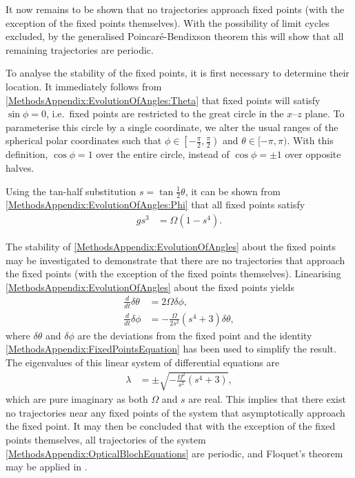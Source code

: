 It now remains to be shown that no trajectories approach fixed points (with the exception of the fixed points themselves).  With the possibility of limit cycles excluded, by the generalised Poincaré-Bendixson theorem this will show that all remaining trajectories are periodic.

To analyse the stability of the fixed points, it is first necessary to determine their location.  It immediately follows from \eqref{MethodsAppendix:EvolutionOfAngles:Theta} that fixed points will satisfy $\sin\phi = 0$, i.e.\ fixed points are restricted to the great circle in the $x$--$z$ plane.  To parameterise this circle by a single coordinate, we alter the usual ranges of the spherical polar coordinates such that $\phi \in \left[-\frac{\pi}{2}, \frac{\pi}{2}\right)$ and $\theta \in [-\pi, \pi)$.  With this definition, $\cos\phi = 1$ over the entire circle, instead of $\cos\phi = \pm 1$ over opposite halves.

Using the tan-half substitution $s = \tan\frac{1}{2}\theta$, it can be shown from \eqref{MethodsAppendix:EvolutionOfAngles:Phi} that all fixed points satisfy
\begin{align}
    g s^3 &= \Omega (1 - s^4). \label{MethodsAppendix:FixedPointsEquation}
\end{align}

The stability of \eqref{MethodsAppendix:EvolutionOfAngles} about the fixed points may be investigated to demonstrate that there are no trajectories that approach the fixed points (with the exception of the fixed points themselves).  Linearising \eqref{MethodsAppendix:EvolutionOfAngles} about the fixed points yields
\begin{align}
    \frac{d}{dt} \delta \theta &= 2 \Omega \delta \phi,\\
    \frac{d}{dt} \delta \phi &= - \frac{\Omega}{2 s^2}(s^4 + 3) \delta \theta,
\end{align}
where $\delta \theta$ and $\delta\phi$ are the deviations from the fixed point and the identity \eqref{MethodsAppendix:FixedPointsEquation} has been used to simplify the result.  The eigenvalues of this linear system of differential equations are
\begin{align}
    \lambda &= \pm\sqrt{- \frac{\Omega^2}{s^2}(s^4 + 3)},
\end{align}
which are pure imaginary as both $\Omega$ and $s$ are real.  This implies that there exist no trajectories near any fixed points of the system that asymptotically approach the fixed point.  It may then be concluded that with the exception of the fixed points themselves, all trajectories of the system \eqref{MethodsAppendix:OpticalBlochEquations} are periodic, and Floquet's theorem may be applied in .

